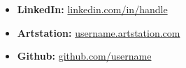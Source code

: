 
\begin{itemize}
    \item \textbf{LinkedIn:} \href{https://www.linkedin.com/in/handle}{linkedin.com/in/handle}
    \item \textbf{Artstation:} \href{https://username.artstation.com}{username.artstation.com}
    \item \textbf{Github:} \href{https://github.com/username}{github.com/username}
\end{itemize}
